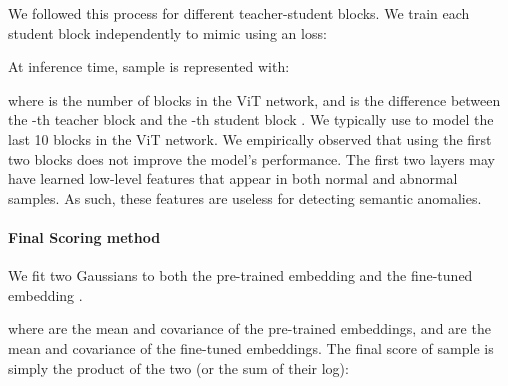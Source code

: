 \documentclass[10pt,twocolumn,letterpaper]{article}
\begin{document}
We followed this process for  different teacher-student blocks. We train each student block  independently to mimic  using an  loss:

At inference time, sample  is represented with:

where  is the number of blocks in the ViT network, and   is the difference between the -th teacher block  and the -th student block . We typically use  to model the last 10 blocks in the ViT network. We empirically observed that using the first two blocks does not improve the model's performance. The first two layers may have learned low-level features that appear in both normal and abnormal samples. As such, these features are useless for detecting semantic anomalies.

\paragraph{Final Scoring method} \label{SubSectionScoringMethod}
We fit two Gaussians to both the pre-trained embedding  and the fine-tuned embedding .


where  are the mean and covariance of the pre-trained embeddings, and  are the mean and covariance of the fine-tuned embeddings. The final score of sample  is simply the product of the two (or the sum of their log):
\end{document}
